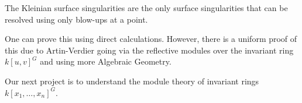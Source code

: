 \begin{thm}
The Kleinian surface singularities are the only surface singularities that can be resolved using only blow-ups at a point. 
\end{thm}


One can prove this using direct calculations. However, there is a uniform proof of this due to Artin-Verdier going via the reflective modules over the invariant ring $k[u,v]^G$ and using more Algebraic Geometry. 


Our next project is to understand the module theory of invariant rings $k[x_1,\ldots,x_n]^G$. 



































